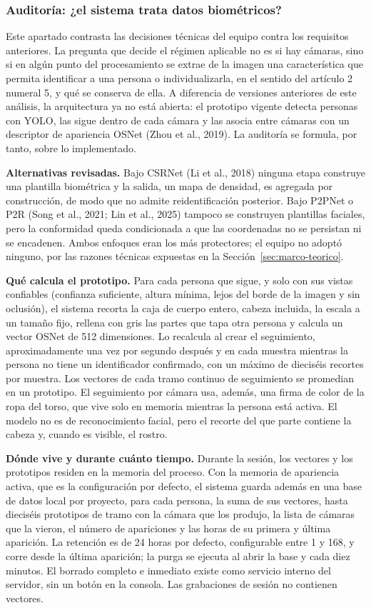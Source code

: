 \subsubsection{Auditoría: ¿el sistema trata datos biométricos?}

Este apartado contrasta las decisiones técnicas del equipo contra los requisitos
anteriores. La pregunta que decide el régimen aplicable no es si hay cámaras,
sino si en algún punto del procesamiento se extrae de la imagen una
característica que permita identificar a una persona o individualizarla, en el
sentido del artículo 2 numeral 5, y qué se conserva de ella. A diferencia de
versiones anteriores de este análisis, la arquitectura ya no está abierta: el
prototipo vigente detecta personas con YOLO, las sigue dentro de cada cámara y
las asocia entre cámaras con un descriptor de apariencia OSNet (Zhou et al.,
2019). La auditoría se formula, por tanto, sobre lo implementado.

\textbf{Alternativas revisadas.} Bajo CSRNet (Li et al., 2018) ninguna etapa
construye una plantilla biométrica y la salida, un mapa de densidad, es
agregada por construcción, de modo que no admite reidentificación posterior.
Bajo P2PNet o P2R (Song et al., 2021; Lin et al., 2025) tampoco se construyen
plantillas faciales, pero la conformidad queda condicionada a que las
coordenadas no se persistan ni se encadenen. Ambos enfoques eran los más
protectores; el equipo no adoptó ninguno, por las razones técnicas expuestas
en la Sección~\ref{sec:marco-teorico}.

\textbf{Qué calcula el prototipo.} Para cada persona que sigue, y solo con sus
vistas confiables (confianza suficiente, altura mínima, lejos del borde de la
imagen y sin oclusión), el sistema recorta la caja de cuerpo entero, cabeza
incluida, la escala a un tamaño fijo, rellena con gris las partes que tapa otra
persona y calcula un vector OSNet de 512 dimensiones. Lo recalcula al crear el
seguimiento, aproximadamente una vez por segundo después y en cada muestra
mientras la persona no tiene un identificador confirmado, con un máximo de
dieciséis recortes por muestra. Los vectores de cada tramo continuo de
seguimiento se promedian en un prototipo. El seguimiento por cámara usa,
además, una firma de color de la ropa del torso, que vive solo en memoria
mientras la persona está activa. El modelo no es de reconocimiento facial, pero
el recorte del que parte contiene la cabeza y, cuando es visible, el rostro.

\textbf{Dónde vive y durante cuánto tiempo.} Durante la sesión, los vectores y
los prototipos residen en la memoria del proceso. Con la memoria de apariencia
activa, que es la configuración por defecto, el sistema guarda además en una
base de datos local por proyecto, para cada persona, la suma de sus vectores,
hasta dieciséis prototipos de tramo con la cámara que los produjo, la lista de
cámaras que la vieron, el número de apariciones y las horas de su primera y
última aparición. La retención es de 24 horas por defecto, configurable entre
1 y 168, y corre desde la última aparición; la purga se ejecuta al abrir la base
y cada diez minutos. El borrado completo e inmediato existe como servicio
interno del servidor, sin un botón en la consola. Las grabaciones de sesión no
contienen vectores.

